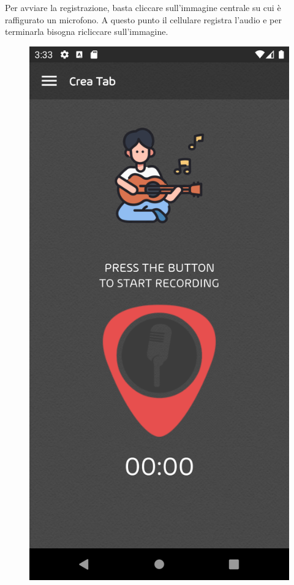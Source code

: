 \newline
Per avviare la registrazione, basta cliccare sull'immagine centrale su cui è raffigurato un microfono. A questo punto il cellulare registra l'audio e per terminarla bisogna ricliccare sull'immagine.
\begin{figure}[H]
	\centering
	\includegraphics[scale=0.10]{./images/img18.png}

\end{figure}
